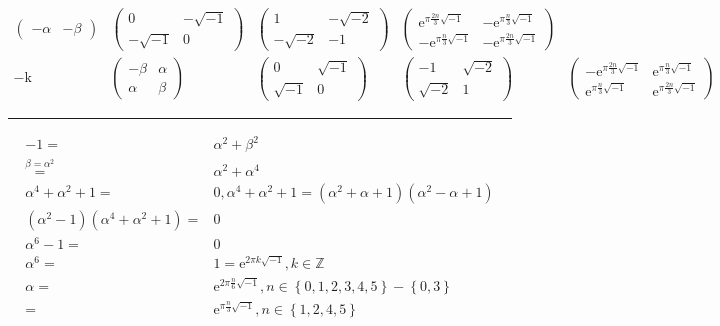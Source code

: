 \documentclass[
]{book}
\theoremstyle{definition}
\theoremstyle{definition}
\theoremstyle{definition}
\theoremstyle{definition}
\theoremstyle{remark}
\begin{document}
\[\begin{array}{ccccc}
\begin{pmatrix}
-\alpha & -\beta
\end{pmatrix} & \begin{pmatrix}0 & -\sqrt{-1}\\
-\sqrt{-1} & 0
\end{pmatrix} & \begin{pmatrix}1 & -\sqrt{-2}\\
-\sqrt{-2} & -1
\end{pmatrix} & \begin{pmatrix}\mathrm{e}^{\pi\frac{2n}{3}\sqrt{-1}} & -\mathrm{e}^{\pi\frac{n}{3}\sqrt{-1}}\\
-\mathrm{e}^{\pi\frac{n}{3}\sqrt{-1}} & -\mathrm{e}^{\pi\frac{2n}{3}\sqrt{-1}}
\end{pmatrix}\\
-\mathrm{k} & \begin{pmatrix}-\beta & \alpha\\
\alpha & \beta
\end{pmatrix} & \begin{pmatrix}0 & \sqrt{-1}\\
\sqrt{-1} & 0
\end{pmatrix} & \begin{pmatrix}-1 & \sqrt{-2}\\
\sqrt{-2} & 1
\end{pmatrix} & \begin{pmatrix}-\mathrm{e}^{\pi\frac{2n}{3}\sqrt{-1}} & \mathrm{e}^{\pi\frac{n}{3}\sqrt{-1}}\\
\mathrm{e}^{\pi\frac{n}{3}\sqrt{-1}} & \mathrm{e}^{\pi\frac{2n}{3}\sqrt{-1}}
\end{pmatrix}
\end{array}
\]

\begin{center}\rule{0.5\linewidth}{0.5pt}\end{center}

\[
\begin{aligned}
-1= & \alpha^{2}+\beta^{2}\\
\overset{\beta=\alpha^{2}}{=} & \alpha^{2}+\alpha^{4}\\
\alpha^{4}+\alpha^{2}+1= & 0,\alpha^{4}+\alpha^{2}+1=\left(\alpha^{2}+\alpha+1\right)\left(\alpha^{2}-\alpha+1\right)\\
\left(\alpha^{2}-1\right)\left(\alpha^{4}+\alpha^{2}+1\right)= & 0\\
\alpha^{6}-1= & 0\\
\alpha^{6}= & 1=\mathrm{e}^{2\pi k\sqrt{-1}},k\in\mathbb{Z}\\
\alpha= & \mathrm{e}^{2\pi\frac{n}{6}\sqrt{-1}},n\in\left\{ 0,1,2,3,4,5\right\} -\left\{ 0,3\right\} \\
= & \mathrm{e}^{\pi\frac{n}{3}\sqrt{-1}},n\in\left\{ 1,2,4,5\right\} 
\end{aligned}
\]
\end{document}
